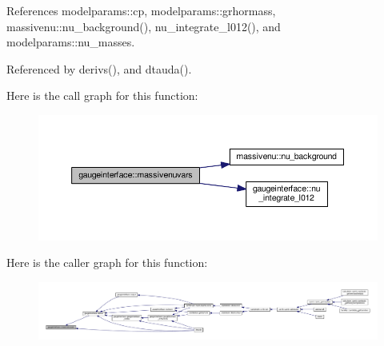 References modelparams\+::cp, modelparams\+::grhormass, massivenu\+::nu\+\_\+background(), nu\+\_\+integrate\+\_\+l012(), and modelparams\+::nu\+\_\+masses.



Referenced by derivs(), and dtauda().

Here is the call graph for this function\+:
\nopagebreak
\begin{figure}[H]
\begin{center}
\leavevmode
\includegraphics[width=350pt]{namespacegaugeinterface_ae4228ed9cfb9382025eb84617b0ed091_cgraph}
\end{center}
\end{figure}
Here is the caller graph for this function\+:
\nopagebreak
\begin{figure}[H]
\begin{center}
\leavevmode
\includegraphics[width=350pt]{namespacegaugeinterface_ae4228ed9cfb9382025eb84617b0ed091_icgraph}
\end{center}
\end{figure}
\mbox{\label{namespacegaugeinterface_ac756539212eaeba8021159b26d1d2881}} 
